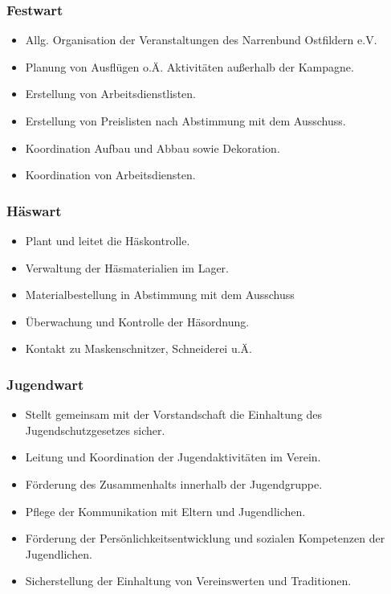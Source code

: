 \subsubsection{Festwart}
\begin{itemize}
    \item Allg. Organisation der Veranstaltungen des Narrenbund Ostfildern e.V.

    \item Planung von Ausflügen o.Ä. Aktivitäten außerhalb der Kampagne.
    
    \item Erstellung von Arbeitsdienstlisten.

    \item Erstellung von Preislisten nach Abstimmung mit dem Ausschuss.

    \item Koordination Aufbau und Abbau sowie Dekoration.

    \item Koordination von Arbeitsdiensten.
\end{itemize}

\subsubsection{Häswart}
\begin{itemize}
    \item Plant und leitet die Häskontrolle.

    \item Verwaltung der Häsmaterialien im Lager.

    \item Materialbestellung in Abstimmung mit dem Ausschuss

    \item Überwachung und Kontrolle der Häsordnung.

    \item Kontakt zu Maskenschnitzer, Schneiderei u.Ä.
\end{itemize}

\subsubsection{Jugendwart}
\begin{itemize}
    \item Stellt gemeinsam mit der Vorstandschaft die Einhaltung des Jugendschutzgesetzes sicher.

    \item Leitung und Koordination der Jugendaktivitäten im Verein. 

    \item Förderung des Zusammenhalts innerhalb der Jugendgruppe.

    \item Pflege der Kommunikation mit Eltern und Jugendlichen.

    \item Förderung der Persönlichkeitsentwicklung und sozialen Kompetenzen der Jugendlichen.

    \item Sicherstellung der Einhaltung von Vereinswerten und Traditionen.
\end{itemize}

